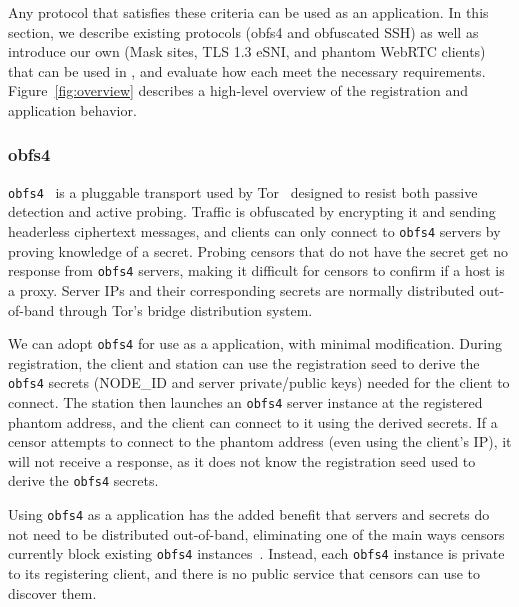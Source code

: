 \documentclass[sigconf]{acmart}
\begin{document}
Any protocol that satisfies these criteria can be used as an application. In
this section, we describe existing protocols (obfs4 and obfuscated SSH) as well
as introduce our own (Mask sites, TLS 1.3 eSNI, and phantom WebRTC clients) that
can be used in \scheme, and evaluate how each meet the necessary requirements.
Figure~\ref{fig:overview} describes a high-level overview of the \scheme
registration and application behavior.

\FigOverview


\subsubsection{obfs4}

\texttt{obfs4}~\cite{obfs4} is a pluggable transport used by
Tor~\cite{tor} designed to resist both passive detection and active probing.
Traffic is obfuscated by encrypting it and sending headerless ciphertext
messages, and clients can only connect to \texttt{obfs4}
servers by proving knowledge of a secret. Probing censors that do not have the
secret get no response from \texttt{obfs4} servers, making it difficult for
censors to confirm if a host is a proxy. Server IPs and their corresponding secrets
are normally distributed out-of-band through Tor's bridge distribution system.

We can adopt \texttt{obfs4} for use as a \scheme application, with minimal
modification. During
registration, the \scheme client and station can use the registration seed to
derive the \texttt{obfs4} secrets (NODE\_ID and server private/public keys)
needed for the client to connect. The station then launches an \texttt{obfs4} server
instance at the registered phantom address, and the client can connect to it using the
derived secrets. If a censor attempts to connect to the phantom address (even
using the client's IP), it will not receive a response, as it does not know the
registration seed used to derive the \texttt{obfs4} secrets.

Using \texttt{obfs4} as a \scheme application has the added benefit that servers
and secrets do not need to be distributed out-of-band, eliminating one of the
main ways censors currently block existing \texttt{obfs4}
instances~\cite{tor-bridge-blocking-blog}. Instead, each \scheme \texttt{obfs4}
instance is private to its registering client, and there is no public service
that censors can use to discover them.

\end{document}
